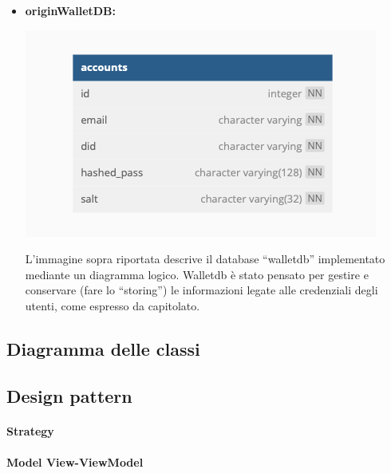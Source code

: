 \begin{itemize}
    \item \textbf{originWalletDB:}
     \begin{center}
        \includegraphics[scale = 0.6]{./res/img/walletdb.png}
      \end{center}
    
    L’immagine sopra riportata descrive il database “walletdb” implementato mediante un diagramma logico.
    Walletdb è stato pensato per gestire e conservare (fare lo “storing”) le informazioni legate alle credenziali degli utenti, come espresso da capitolato.\\
    
\end{itemize} 


\subsection{Diagramma delle classi}

\subsection{Design pattern}
\paragraph{Strategy}
\paragraph{Model View-ViewModel}
